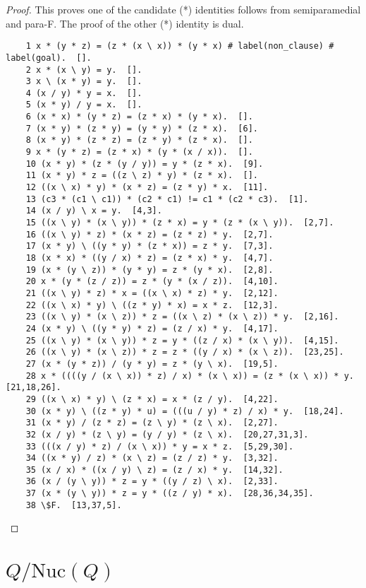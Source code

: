 \documentclass[12pt]{report}
\theoremstyle{definition}
\newcommand{\rdv}{/}                %
\newcommand{\nuc}{\text{Nuc}}       %
\begin{document}
\begin{proof}\label{appendix:semipara+paraF}
  This proves one of the candidate (*) identities follows from semiparamedial and para-F. The proof of the other (*) identity is dual.
  \begin{lstlisting} 
    1 x * (y * z) = (z * (x \ x)) * (y * x) # label(non_clause) # label(goal).  [].
    2 x * (x \ y) = y.  [].
    3 x \ (x * y) = y.  [].
    4 (x / y) * y = x.  [].
    5 (x * y) / y = x.  [].
    6 (x * x) * (y * z) = (z * x) * (y * x).  [].
    7 (x * y) * (z * y) = (y * y) * (z * x).  [6].
    8 (x * y) * (z * z) = (z * y) * (z * x).  [].
    9 x * (y * z) = (z * x) * (y * (x / x)).  [].
    10 (x * y) * (z * (y / y)) = y * (z * x).  [9].
    11 (x * y) * z = ((z \ z) * y) * (z * x).  [].
    12 ((x \ x) * y) * (x * z) = (z * y) * x.  [11].
    13 (c3 * (c1 \ c1)) * (c2 * c1) != c1 * (c2 * c3).  [1].
    14 (x / y) \ x = y.  [4,3].
    15 ((x \ y) * (x \ y)) * (z * x) = y * (z * (x \ y)).  [2,7].
    16 ((x \ y) * z) * (x * z) = (z * z) * y.  [2,7].
    17 (x * y) \ ((y * y) * (z * x)) = z * y.  [7,3].
    18 (x * x) * ((y / x) * z) = (z * x) * y.  [4,7].
    19 (x * (y \ z)) * (y * y) = z * (y * x).  [2,8].
    20 x * (y * (z / z)) = z * (y * (x / z)).  [4,10].
    21 ((x \ y) * z) * x = ((x \ x) * z) * y.  [2,12].
    22 ((x \ x) * y) \ ((z * y) * x) = x * z.  [12,3].
    23 ((x \ y) * (x \ z)) * z = ((x \ z) * (x \ z)) * y.  [2,16].
    24 (x * y) \ ((y * y) * z) = (z / x) * y.  [4,17].
    25 ((x \ y) * (x \ y)) * z = y * ((z / x) * (x \ y)).  [4,15].
    26 ((x \ y) * (x \ z)) * z = z * ((y / x) * (x \ z)).  [23,25].
    27 (x * (y * z)) / (y * y) = z * (y \ x).  [19,5].
    28 x * ((((y / (x \ x)) * z) / x) * (x \ x)) = (z * (x \ x)) * y.  [21,18,26].
    29 ((x \ x) * y) \ (z * x) = x * (z / y).  [4,22].
    30 (x * y) \ ((z * y) * u) = (((u / y) * z) / x) * y.  [18,24].
    31 (x * y) / (z * z) = (z \ y) * (z \ x).  [2,27].
    32 (x / y) * (z \ y) = (y / y) * (z \ x).  [20,27,31,3].
    33 (((x / y) * z) / (x \ x)) * y = x * z.  [5,29,30].
    34 ((x * y) / z) * (x \ z) = (z / z) * y.  [3,32].
    35 (x / x) * ((x / y) \ z) = (z / x) * y.  [14,32].
    36 (x / (y \ y)) * z = y * ((y / z) \ x).  [2,33].
    37 (x * (y \ y)) * z = y * ((z / y) * x).  [28,36,34,35].
    38 \$F.  [13,37,5]. 
  \end{lstlisting}
\end{proof}


\section{$Q\rdv\nuc(Q)$}
\end{document}
